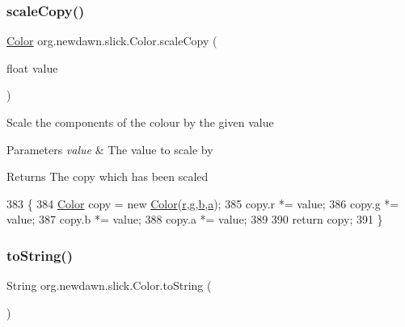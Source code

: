 \subsubsection{\texorpdfstring{scale\+Copy()}{scaleCopy()}}
{\footnotesize\ttfamily \mbox{\hyperlink{classorg_1_1newdawn_1_1slick_1_1_color}{Color}} org.\+newdawn.\+slick.\+Color.\+scale\+Copy (\begin{DoxyParamCaption}\item[{float}]{value }\end{DoxyParamCaption})\hspace{0.3cm}{\ttfamily [inline]}}

Scale the components of the colour by the given value


\begin{DoxyParams}{Parameters}
{\em value} & The value to scale by \\
\hline
\end{DoxyParams}
\begin{DoxyReturn}{Returns}
The copy which has been scaled 
\end{DoxyReturn}

\begin{DoxyCode}
383                                         \{
384         \mbox{\hyperlink{classorg_1_1newdawn_1_1slick_1_1_color_a39db992a7910141605cc2acb953c4917}{Color}} copy = \textcolor{keyword}{new} \mbox{\hyperlink{classorg_1_1newdawn_1_1slick_1_1_color_a39db992a7910141605cc2acb953c4917}{Color}}(\mbox{\hyperlink{classorg_1_1newdawn_1_1slick_1_1_color_ac07fa95108064b044dcf9a53e95dcb48}{r}},\mbox{\hyperlink{classorg_1_1newdawn_1_1slick_1_1_color_aa6ebff7c102a1476e7b511a78397b753}{g}},\mbox{\hyperlink{classorg_1_1newdawn_1_1slick_1_1_color_a8c0cef152e16438fee852a97e50ef7a5}{b}},\mbox{\hyperlink{classorg_1_1newdawn_1_1slick_1_1_color_ab9288c822ff7614a77c887eb8c2595a7}{a}});
385         copy.r *= value;
386         copy.g *= value;
387         copy.b *= value;
388         copy.a *= value;
389         
390         \textcolor{keywordflow}{return} copy;
391     \}
\end{DoxyCode}
\mbox{\label{classorg_1_1newdawn_1_1slick_1_1_color_aa74625688220b3296e342ae23eabf2e9}} 
\subsubsection{\texorpdfstring{to\+String()}{toString()}}
{\footnotesize\ttfamily String org.\+newdawn.\+slick.\+Color.\+to\+String (\begin{DoxyParamCaption}{ }\end{DoxyParamCaption})\hspace{0.3cm}{\ttfamily [inline]}}

